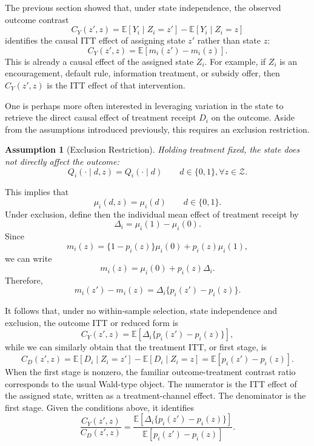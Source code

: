 \documentclass[11pt]{article}
\newtheorem{assumption}{Assumption}
\newcommand{\E}{\mathbb{E}}
\newcommand{\1}{\mathbf{1}}
\newcommand{\cZ}{\mathcal{Z}}
\begin{document}
The previous section showed that, under state independence, the observed
outcome contrast
\[
        C_Y(z',z)
        =
        \E[Y_i\mid Z_i=z']-\E[Y_i\mid Z_i=z]
\]
identifies the causal ITT effect of assigning state \(z'\) rather than state
\(z\):
\[
        C_Y(z',z)
        =
        \E[m_i(z')-m_i(z)].
\]
This is already a causal effect of the assigned state \(Z_i\). For example,
if \(Z_i\) is an encouragement, default rule, information treatment, or subsidy
offer, then \(C_Y(z',z)\) is the ITT effect of that intervention.

One is perhaps more often interested in leveraging variation in the state to retrieve the direct causal effect of treatment receipt \(D_i\) on the outcome.  Aside from the assumptions introduced previously, this requires
an exclusion restriction. 

\begin{assumption}[Exclusion Restriction]
\label{exclusion}
Holding treatment fixed, the state does not directly
affect the outcome:
\[
        Q_i(\cdot\mid d,z)=Q_i(\cdot\mid d)
        \qquad d\in\{0,1\}, \forall z \in \cZ.
\]
\end{assumption}
This implies that
\[
        \mu_i(d,z)=\mu_i(d)
        \qquad d\in\{0,1\}.
\]
\noindent Under exclusion, define then the individual mean effect of treatment receipt by
\[
        \Delta_i=\mu_i(1)-\mu_i(0).
\]
Since
\[
        m_i(z)
        =
        \{1-p_i(z)\}\mu_i(0)+p_i(z)\mu_i(1),
\]
we can write
\[
        m_i(z)
        =
        \mu_i(0)+p_i(z)\Delta_i.
\]
Therefore,
\[
        m_i(z')-m_i(z)
        =
        \Delta_i\{p_i(z')-p_i(z)\}.
\]

It follows that, under no within-sample selection, state independence and exclusion, the outcome ITT or reduced form is
\[
        C_Y(z',z)
        =
        \E[\Delta_i\{p_i(z')-p_i(z)\}],
\]
while we can similarly obtain that the treatment ITT, or first stage, is
\[
        C_D(z',z)
        =
        \E[D_i\mid Z_i=z']-\E[D_i\mid Z_i=z]
        =
        \E[p_i(z')-p_i(z)].
\]
When the first stage is nonzero, the familiar outcome-treatment contrast ratio corresponds to the usual Wald-type object.  The numerator
is the ITT effect of the assigned state, written as a treatment-channel effect.
The denominator is the first stage. Given the conditions above, it identifies
\begin{equation} \label{eq:contrast_ratio}
        \frac{C_Y(z',z)}{C_D(z',z)}
        =
        \frac{\E[\Delta_i\{p_i(z')-p_i(z)\}]}
        {\E[p_i(z')-p_i(z)]}.
\end{equation}
\end{document}
